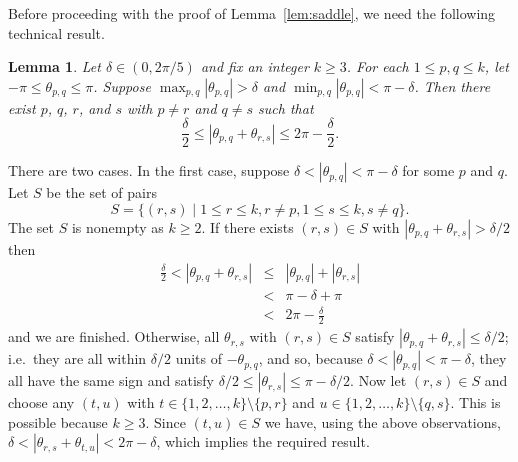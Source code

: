\documentclass[12pt]{article}
\newcommand{\lab}[1]{\label{#1}}
\newtheorem{lemma}[thm]{Lemma}
\def\proof{\par\noindent{\bf Proof.\enspace}\rm}
\begin{document}
Before proceeding with the proof of Lemma~\ref{lem:saddle}, we need the following technical result.
\begin{lemma}
\lab{lem:SaddlePair}
Let $\delta\in(0,2\pi/5)$ and fix an integer $k\ge 3$. For each
$1\le p,q \le k$, let
$-\pi \le \theta_{p,q} \le \pi$. Suppose 
$\max_{p,q} |\theta_{p,q}| > \delta$ and
$\min_{p,q} |\theta_{p,q}| < \pi - \delta$. 
Then there exist $p$, $q$, $r$, and $s$
with $p\ne r$ and $q\ne s$ such that 
\[
\frac{\delta}{2} \le |\theta_{p,q}+\theta_{r,s}| \le 2\pi - \frac{\delta}{2}.
\]
\end{lemma}
%
\proof%
There are two cases. In the first case, suppose 
$\delta < |\theta_{p,q}| < \pi  - \delta$ for some $p$ and $q$.
Let $S$ be the set of pairs
\[
S= \{ (r,s) \mid 1\le r\le k, r\ne p, 1\le s\le k, s\ne q\}.
\]
The set $S$ is nonempty as $k\ge 2$. If there exists $(r,s)\in S$ with
$|\theta_{p,q}+\theta_{r,s}|>\delta/2$ then
\begin{eqnarray*}
\frac{\delta}{2} < |\theta_{p,q}+\theta_{r,s}| 
&\le& |\theta_{p,q}|+|\theta_{r,s}|\\
&<& \pi - \delta + \pi\\
&<& 2\pi - \frac{\delta}{2}
\end{eqnarray*}
and we are finished. Otherwise, all $\theta_{r,s}$ with $(r,s)\in S$ satisfy 
$|\theta_{p,q}+\theta_{r,s}|\le\delta/2$; i.e.\ they are all within $\delta/2$ units
of $-\theta_{p,q}$, and so, because $\delta < |\theta_{p,q}| < \pi-\delta$, 
they all have the same sign and satisfy $\delta/2 \le |\theta_{r,s}| \le \pi-\delta/2$.
Now let $(r,s)\in S$ and choose any $(t,u)$ with 
$t\in\{1, 2, \ldots, k\}\setminus\{p,r\}$ and
$u\in\{1, 2, \ldots, k\}\setminus\{q,s\}$. This is possible because $k\ge 3$.
Since $(t,u)\in S$ we have, using the above observations, 
$\delta < |\theta_{r,s}+\theta_{t,u}|<2\pi-\delta$,
which implies the required result.
\end{document}
